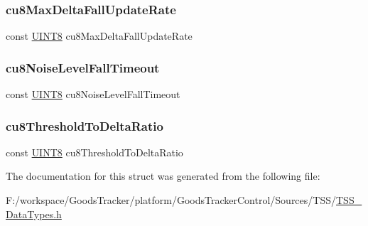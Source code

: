 \subsubsection{\texorpdfstring{cu8\+Max\+Delta\+Fall\+Update\+Rate}{cu8MaxDeltaFallUpdateRate}}
{\footnotesize\ttfamily const \hyperlink{_t_s_s___data_types_8h_ab27e9918b538ce9d8ca692479b375b6a}{U\+I\+N\+T8} cu8\+Max\+Delta\+Fall\+Update\+Rate}

\mbox{\label{struct_t_s_s___auto_sens_calib_context_a2eb1ffb69158e0ac8f1cdcb91e592bef}} 
\subsubsection{\texorpdfstring{cu8\+Noise\+Level\+Fall\+Timeout}{cu8NoiseLevelFallTimeout}}
{\footnotesize\ttfamily const \hyperlink{_t_s_s___data_types_8h_ab27e9918b538ce9d8ca692479b375b6a}{U\+I\+N\+T8} cu8\+Noise\+Level\+Fall\+Timeout}

\mbox{\label{struct_t_s_s___auto_sens_calib_context_a6517f408af4750e50a87e8080b3ccabd}} 
\subsubsection{\texorpdfstring{cu8\+Threshold\+To\+Delta\+Ratio}{cu8ThresholdToDeltaRatio}}
{\footnotesize\ttfamily const \hyperlink{_t_s_s___data_types_8h_ab27e9918b538ce9d8ca692479b375b6a}{U\+I\+N\+T8} cu8\+Threshold\+To\+Delta\+Ratio}



The documentation for this struct was generated from the following file\+:\begin{DoxyCompactItemize}
\item 
F\+:/workspace/\+Goods\+Tracker/platform/\+Goods\+Tracker\+Control/\+Sources/\+T\+S\+S/\hyperlink{_t_s_s___data_types_8h}{T\+S\+S\+\_\+\+Data\+Types.\+h}\end{DoxyCompactItemize}
